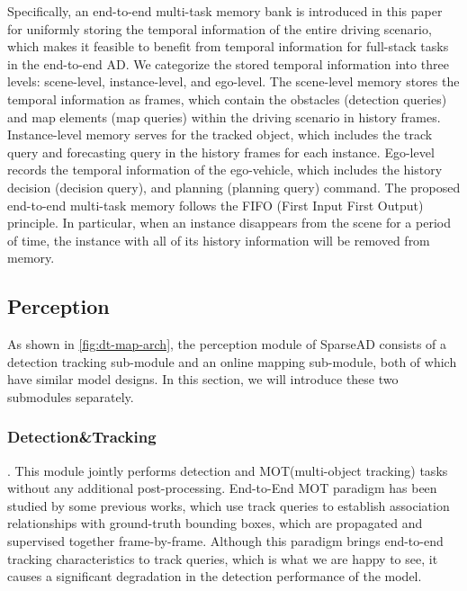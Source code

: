 Specifically, an end-to-end multi-task memory bank is introduced in this paper for uniformly storing the temporal information of the entire driving scenario, which makes it feasible to benefit from temporal information for full-stack tasks in the end-to-end AD. We categorize the stored temporal information into three levels: scene-level, instance-level, and ego-level. The scene-level memory stores the temporal information as frames, which contain the obstacles (detection queries) and map elements (map queries) within the driving scenario in history frames. Instance-level memory serves for the tracked object, which includes the track query and forecasting query in the history frames for each instance. Ego-level records the temporal information of the ego-vehicle, which includes the history decision (decision query), and planning (planning query) command. The proposed end-to-end multi-task memory follows the FIFO (First Input First Output) principle. In particular, when an instance disappears from the scene for a period of time, the instance with all of its history information will be removed from memory.


\subsection{Perception}



As shown in \cref{fig:dt-map-arch}, the perception module of SparseAD consists of a detection tracking sub-module and an online mapping sub-module, both of which have similar model designs. In this section, we will introduce these two submodules separately.


\subsubsection{Detection\&Tracking}. This module jointly performs detection and MOT(multi-object tracking) tasks without any additional post-processing. End-to-End MOT paradigm has been studied by some previous works\cite{zeng2022motr,yu2023motrv3, pang2023standing, gu2023vip3d, hu2023planning}, which use track queries to establish association relationships with ground-truth bounding boxes, which are propagated and supervised together frame-by-frame. Although this paradigm brings end-to-end tracking characteristics to track queries, which is what we are happy to see, it causes a significant degradation in the detection performance of the model\cite{yu2023motrv3, hu2023planning}.

